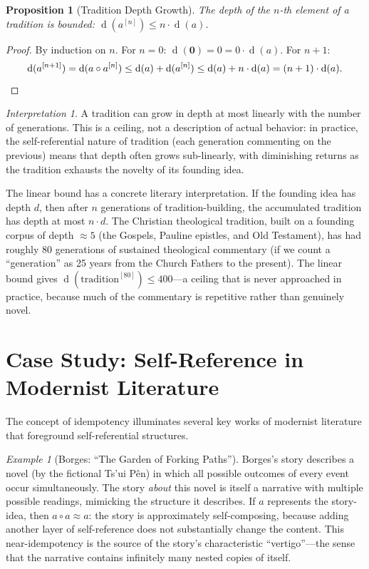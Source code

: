 \documentclass[11pt,openany]{book}
\theoremstyle{definition}
\theoremstyle{plain}
\newtheorem{proposition}[axiom]{Proposition}
\theoremstyle{remark}
\newtheorem{example}[axiom]{Example}
\newtheorem{interpretation}[axiom]{Interpretation}
\newcommand{\compose}{\circ}                 %
\newcommand{\void}{\mathbf{0}}              %
\newcommand{\depth}{\operatorname{d}}       %
\begin{document}
\begin{proposition}[Tradition Depth Growth]
The depth of the $n$-th element of a tradition is bounded: $\depth(a^{[n]}) \leq n \cdot \depth(a)$.
\end{proposition}

\begin{proof}
By induction on $n$. For $n = 0$: $\depth(\void) = 0 = 0 \cdot \depth(a)$. For $n + 1$:
\[
\depth(a^{[n+1]}) = \depth(a \compose a^{[n]}) \leq \depth(a) + \depth(a^{[n]}) \leq \depth(a) + n \cdot \depth(a) = (n+1) \cdot \depth(a). \qedhere
\]
\end{proof}

\begin{interpretation}
A tradition can grow in depth at most linearly with the number of generations. This is a ceiling, not a description of actual behavior: in practice, the self-referential nature of tradition (each generation commenting on the previous) means that depth often grows sub-linearly, with diminishing returns as the tradition exhausts the novelty of its founding idea.

The linear bound has a concrete literary interpretation. If the founding idea has depth $d$, then after $n$ generations of tradition-building, the accumulated tradition has depth at most $n \cdot d$. The Christian theological tradition, built on a founding corpus of depth $\approx 5$ (the Gospels, Pauline epistles, and Old Testament), has had roughly 80 generations of sustained theological commentary (if we count a ``generation'' as 25 years from the Church Fathers to the present). The linear bound gives $\depth(\text{tradition}^{[80]}) \leq 400$---a ceiling that is never approached in practice, because much of the commentary is repetitive rather than genuinely novel.
\end{interpretation}

\section{Case Study: Self-Reference in Modernist Literature}

The concept of idempotency illuminates several key works of modernist literature that foreground self-referential structures.

\begin{example}[Borges: ``The Garden of Forking Paths'']
Borges's story describes a novel (by the fictional Ts'ui P\^en) in which all possible outcomes of every event occur simultaneously. The story \emph{about} this novel is itself a narrative with multiple possible readings, mimicking the structure it describes. If $a$ represents the story-idea, then $a \compose a \approx a$: the story is approximately self-composing, because adding another layer of self-reference does not substantially change the content. This near-idempotency is the source of the story's characteristic ``vertigo''---the sense that the narrative contains infinitely many nested copies of itself.
\end{example}
\end{document}
